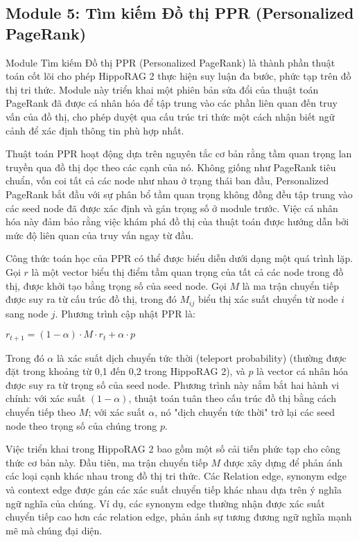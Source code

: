 \documentclass[../main.tex]{subfiles}
\begin{document}
\subsection{Module 5: Tìm kiếm Đồ thị PPR (Personalized PageRank)}
Module Tìm kiếm Đồ thị PPR (Personalized PageRank) là thành phần thuật toán cốt lõi cho phép HippoRAG 2 thực hiện suy luận đa bước, phức tạp trên đồ thị tri thức. Module này triển khai một phiên bản sửa đổi của thuật toán PageRank đã được cá nhân hóa để tập trung vào các phần liên quan đến truy vấn của đồ thị, cho phép duyệt qua cấu trúc tri thức một cách nhận biết ngữ cảnh để xác định thông tin phù hợp nhất.

Thuật toán PPR hoạt động dựa trên nguyên tắc cơ bản rằng tầm quan trọng lan truyền qua đồ thị dọc theo các cạnh của nó. Không giống như PageRank tiêu chuẩn, vốn coi tất cả các node như nhau ở trạng thái ban đầu, Personalized PageRank bắt đầu với sự phân bổ tầm quan trọng không đồng đều tập trung vào các seed node đã được xác định và gán trọng số ở module trước. Việc cá nhân hóa này đảm bảo rằng việc khám phá đồ thị của thuật toán được hướng dẫn bởi mức độ liên quan của truy vấn ngay từ đầu.

Công thức toán học của PPR có thể được biểu diễn dưới dạng một quá trình lặp. Gọi $r$ là một vector biểu thị điểm tầm quan trọng của tất cả các node trong đồ thị, được khởi tạo bằng trọng số của seed node. Gọi $M$ là ma trận chuyển tiếp được suy ra từ cấu trúc đồ thị, trong đó $M_{ij}$ biểu thị xác suất chuyển từ node $i$ sang node $j$. Phương trình cập nhật PPR là:

$r_{t+1} = (1-\alpha) \cdot M \cdot r_t + \alpha \cdot p$

Trong đó $\alpha$ là xác suất dịch chuyển tức thời (teleport probability) (thường được đặt trong khoảng từ 0,1 đến 0,2 trong HippoRAG 2), và $p$ là vector cá nhân hóa được suy ra từ trọng số của seed node. Phương trình này nắm bắt hai hành vi chính: với xác suất $(1-\alpha)$, thuật toán tuân theo cấu trúc đồ thị bằng cách chuyển tiếp theo $M$; với xác suất $\alpha$, nó "dịch chuyển tức thời" trở lại các seed node theo trọng số của chúng trong $p$.

Việc triển khai trong HippoRAG 2 bao gồm một số cải tiến phức tạp cho công thức cơ bản này. Đầu tiên, ma trận chuyển tiếp $M$ được xây dựng để phản ánh các loại cạnh khác nhau trong đồ thị tri thức. Các Relation edge, synonym edge và context edge được gán các xác suất chuyển tiếp khác nhau dựa trên ý nghĩa ngữ nghĩa của chúng. Ví dụ, các synonym edge thường nhận được xác suất chuyển tiếp cao hơn các relation edge, phản ánh sự tương đương ngữ nghĩa mạnh mẽ mà chúng đại diện.
\end{document}

